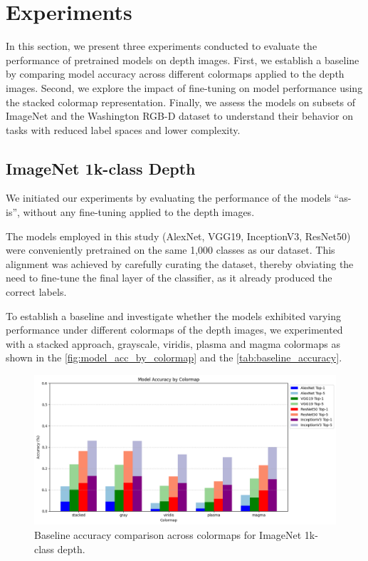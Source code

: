 \section{Experiments}
In this section, we present three experiments conducted to evaluate the performance of pretrained models on depth images. First, we establish a baseline by comparing model accuracy across different colormaps applied to the depth images. Second, we explore the impact of fine-tuning on model performance using the stacked colormap representation. Finally, we assess the models on subsets of ImageNet and the Washington RGB-D dataset to understand their behavior on tasks with reduced label spaces and lower complexity.

\subsection{ImageNet 1k-class Depth}
We initiated our experiments by evaluating the performance of the models ``as-is'', without any fine-tuning applied to the depth images.

The models employed in this study (AlexNet, VGG19, InceptionV3, ResNet50) were conveniently pretrained on the same 1,000 classes as our dataset. This alignment was achieved by carefully curating the dataset, thereby obviating the need to fine-tune the final layer of the classifier, as it already produced the correct labels.

To establish a baseline and investigate whether the models exhibited varying performance under different colormaps of the depth images, we experimented with a stacked approach, grayscale, viridis, plasma and magma colormaps as shown in the \autoref{fig:model_acc_by_colormap} and the \autoref{tab:baseline_accuracy}.

\begin{figure}[h]
    \centering
    \includegraphics[width=1\linewidth]{./images/model_acc_by_colormap.png}
    \caption{Baseline accuracy comparison across colormaps for ImageNet 1k-class depth.}
    \label{fig:model_acc_by_colormap}
\end{figure}


